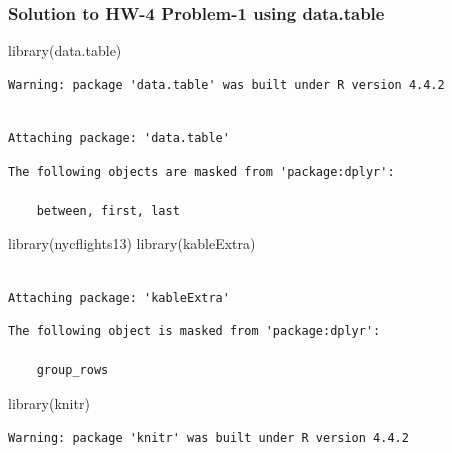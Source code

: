 \documentclass[
  12pt,
]{article}
\newenvironment{Shaded}{\begin{snugshade}}{\end{snugshade}}
\newcommand{\FunctionTok}[1]{\textcolor[rgb]{0.28,0.35,0.67}{#1}}
\newcommand{\NormalTok}[1]{\textcolor[rgb]{0.00,0.23,0.31}{#1}}
\begin{document}
\subsubsection{Solution to HW-4 Problem-1 using
data.table}\label{solution-to-hw-4-problem-1-using-data.table}

\begin{Shaded}
\begin{Highlighting}[]
\FunctionTok{library}\NormalTok{(data.table)}
\end{Highlighting}
\end{Shaded}

\begin{verbatim}
Warning: package 'data.table' was built under R version 4.4.2
\end{verbatim}

\begin{verbatim}

Attaching package: 'data.table'
\end{verbatim}

\begin{verbatim}
The following objects are masked from 'package:dplyr':

    between, first, last
\end{verbatim}

\begin{Shaded}
\begin{Highlighting}[]
\FunctionTok{library}\NormalTok{(nycflights13)}
\FunctionTok{library}\NormalTok{(kableExtra)}
\end{Highlighting}
\end{Shaded}

\begin{verbatim}

Attaching package: 'kableExtra'
\end{verbatim}

\begin{verbatim}
The following object is masked from 'package:dplyr':

    group_rows
\end{verbatim}

\begin{Shaded}
\begin{Highlighting}[]
\FunctionTok{library}\NormalTok{(knitr)}
\end{Highlighting}
\end{Shaded}

\begin{verbatim}
Warning: package 'knitr' was built under R version 4.4.2
\end{verbatim}
\end{document}
